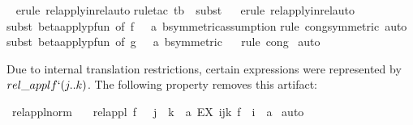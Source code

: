 \begin{isabellebody}
\ {}\isanewline
{}\isamarkupfalse%
{\isacharparenleft}erule\ rel{\isacharunderscore}apply{\isacharunderscore}in{\isacharunderscore}rel{\isacharcomma}auto{\isacharparenright}\isanewline
{}\isamarkupfalse%
{\isacharparenleft}rule{\isacharunderscore}tac\ t{\isacharequal}b\ \ subst{\isacharparenright}\ \isamarkupfalse%
\ {}\isanewline
{}\isamarkupfalse%
{\isacharparenleft}erule\ rel{\isacharunderscore}apply{\isacharunderscore}in{\isacharunderscore}rel{\isacharcomma}auto{\isacharparenright}\isanewline
{}\isamarkupfalse%
{\isacharparenleft}subst\ beta{\isacharunderscore}apply{\isacharunderscore}pfun\ {\isacharbrackleft}of\ f\ {\isacharunderscore}\ {\isacharunderscore}\ a\ b{\isacharcomma}symmetric{\isacharbrackright}{\isacharcomma}assumption{\isacharplus}{\isacharparenright}\isanewline
{}\isamarkupfalse%
{\isacharparenleft}rule\ cong{\isacharbrackleft}symmetric{\isacharbrackright}{\isacharcomma}\ auto{\isacharparenright}\isanewline
{}\isamarkupfalse%
{\isacharparenleft}subst\ beta{\isacharunderscore}apply{\isacharunderscore}pfun\ {\isacharbrackleft}of\ g\ {\isacharunderscore}\ {\isacharunderscore}\ a\ b{\isacharcomma}symmetric{\isacharbrackright}{\isacharparenright}\ \isamarkupfalse%
\ {}\isanewline
{}\isamarkupfalse%
{\isacharparenleft}rule\ cong{\isacharparenright}\isanewline
{}\isamarkupfalse%
\ auto\isanewline
{}\isamarkupfalse%
%
\endisatagproof
{\isafoldproof}%
%
\isadelimproof
%
\endisadelimproof
%
\begin{isamarkuptext}%
Due to internal translation restrictions, certain expressions were  
       represented by $rel\_appl f ` ( j .. k)$. The following property 
       removes this artifact:%
\end{isamarkuptext}%
\isamarkuptrue%
\isamarkupfalse%
\ rel{\isacharunderscore}appl{\isacharunderscore}norm\ {\isacharcolon}\ \ \isanewline
{\isachardoublequoteopen}rel{\isacharunderscore}appl\ f\ {\isacharbackquote}\ {\isacharparenleft}\ j\ {\isachardot}{\isachardot}\ k{\isacharparenright}\ {\isacharequal}\ {\isacharbraceleft}a{\isachardot}\ EX\ i{\isacharcolon}j{\isachardot}{\isachardot}k{\isachardot}\ f\ {\isacharpercent}{\isacharcircum}\ i\ {\isacharequal}\ a{\isacharbraceright}{\isachardoublequoteclose}\ \isanewline
%
\isadelimproof
%
\endisadelimproof
%
\isatagproof
{}\isamarkupfalse%
{\isacharparenleft}auto{\isacharparenright}%
\endisatagproof
{\isafoldproof}%
%
\isadelimproof
\isanewline
%
\endisadelimproof
\isanewline
%
\isadelimtheory
\isanewline
%
\endisadelimtheory
%
\isatagtheory
{}\isamarkupfalse%
%
\endisatagtheory
{\isafoldtheory}%
%
\isadelimtheory
\isanewline
%
\endisadelimtheory
\isanewline
\ \ \isanewline
\end{isabellebody}%

